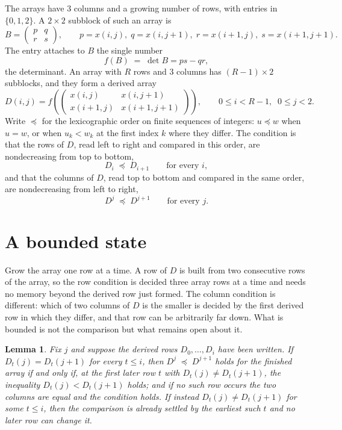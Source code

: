 \documentclass[11pt,a4paper]{article}
\theoremstyle{plain}
\newtheorem{lemma}[theorem]{Lemma}
\theoremstyle{definition}
\begin{document}
The arrays have $3$ columns and a growing number of rows, with entries in $\{0,1,2\}$. A
$2\times2$ subblock of such an array is
\[
B=\begin{pmatrix} p & q \\ r & s \end{pmatrix},
\qquad p=x(i,j),\; q=x(i,j+1),\; r=x(i+1,j),\; s=x(i+1,j+1).
\]
The entry attaches to $B$ the single number
\[
f(B)\;=\;\det B=ps-qr,
\]
the determinant. An array with $R$ rows and $3$ columns has $(R-1)\times2$ subblocks, and they
form a derived array
\[
D(i,j)=f\!\left(\begin{pmatrix} x(i,j) & x(i,j+1) \\ x(i+1,j) & x(i+1,j+1)\end{pmatrix}
\right),\qquad 0\le i<R-1,\;\; 0\le j<2 .
\]
Write $\preceq$ for the lexicographic order on finite sequences of integers: $u\preceq w$ when
$u=w$, or when $u_k<w_k$ at the first index $k$ where they differ. The condition is that the
rows of $D$, read left to right and compared in this order, are nondecreasing from top to bottom,
\[
D_{i}\;\preceq\;D_{i+1}\qquad\text{for every } i,
\]
and that the columns of $D$, read top to bottom and compared in the same order, are nondecreasing
from left to right,
\[
D^{j}\;\preceq\;D^{j+1}\qquad\text{for every } j .
\]

\section{A bounded state}

Grow the array one row at a time. A row of $D$ is built from two consecutive rows of the array,
so the row condition is decided three array rows at a time and needs no memory beyond the
derived row just formed. The column condition is different: which of two columns of $D$ is the
smaller is decided by the first derived row in which they differ, and that row can be
arbitrarily far down. What is bounded is not the comparison but what remains open about it.

\begin{lemma}\label{lem:bits}
Fix $j$ and suppose the derived rows $D_0,\dots,D_i$ have been written. If $D_t(j)=D_t(j+1)$ for
every $t\le i$, then $D^{j}\;\preceq\;D^{j+1}$ holds for the finished array if and only if,
at the first later row $t$ with $D_t(j)\neq D_t(j+1)$, the inequality $D_t(j)<D_t(j+1)$
holds; and if no such row occurs the two columns are equal and the condition holds. If instead
$D_t(j)\neq D_t(j+1)$ for some $t\le i$, then the comparison is already settled by the earliest
such $t$ and no later row can change it.
\end{lemma}
\end{document}
